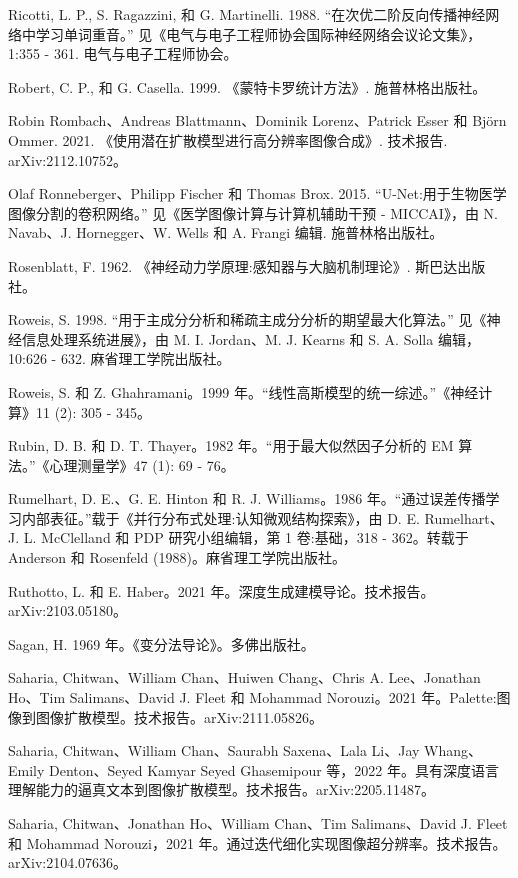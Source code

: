 \documentclass[10pt]{article}
\begin{document}
Ricotti, L. P., S. Ragazzini, 和 G. Martinelli. 1988. “在次优二阶反向传播神经网络中学习单词重音。” 见《电气与电子工程师协会国际神经网络会议论文集》，1:355 - 361. 电气与电子工程师协会。

Robert, C. P., 和 G. Casella. 1999. 《蒙特卡罗统计方法》. 施普林格出版社。

Robin Rombach、Andreas Blattmann、Dominik Lorenz、Patrick Esser 和 Björn Ommer. 2021. 《使用潜在扩散模型进行高分辨率图像合成》. 技术报告. arXiv:2112.10752。

Olaf Ronneberger、Philipp Fischer 和 Thomas Brox. 2015. “U-Net:用于生物医学图像分割的卷积网络。” 见《医学图像计算与计算机辅助干预 - MICCAI》，由 N. Navab、J. Hornegger、W. Wells 和 A. Frangi 编辑. 施普林格出版社。

Rosenblatt, F. 1962. 《神经动力学原理:感知器与大脑机制理论》. 斯巴达出版社。

Roweis, S. 1998. “用于主成分分析和稀疏主成分分析的期望最大化算法。” 见《神经信息处理系统进展》，由 M. I. Jordan、M. J. Kearns 和 S. A. Solla 编辑，10:626 - 632. 麻省理工学院出版社。

Roweis, S. 和 Z. Ghahramani。1999 年。“线性高斯模型的统一综述。”《神经计算》11 (2): 305 - 345。

Rubin, D. B. 和 D. T. Thayer。1982 年。“用于最大似然因子分析的 EM 算法。”《心理测量学》47 (1): 69 - 76。

Rumelhart, D. E.、G. E. Hinton 和 R. J. Williams。1986 年。“通过误差传播学习内部表征。”载于《并行分布式处理:认知微观结构探索》，由 D. E. Rumelhart、J. L. McClelland 和 PDP 研究小组编辑，第 1 卷:基础，318 - 362。转载于 Anderson 和 Rosenfeld (1988)。麻省理工学院出版社。

Ruthotto, L. 和 E. Haber。2021 年。深度生成建模导论。技术报告。arXiv:2103.05180。

Sagan, H. 1969 年。《变分法导论》。多佛出版社。

Saharia, Chitwan、William Chan、Huiwen Chang、Chris A. Lee、Jonathan Ho、Tim Salimans、David J. Fleet 和 Mohammad Norouzi。2021 年。Palette:图像到图像扩散模型。技术报告。arXiv:2111.05826。

Saharia, Chitwan、William Chan、Saurabh Saxena、Lala Li、Jay Whang、Emily Denton、Seyed Kamyar Seyed Ghasemipour 等，2022 年。具有深度语言理解能力的逼真文本到图像扩散模型。技术报告。arXiv:2205.11487。

Saharia, Chitwan、Jonathan Ho、William Chan、Tim Salimans、David J. Fleet 和 Mohammad Norouzi，2021 年。通过迭代细化实现图像超分辨率。技术报告。arXiv:2104.07636。
\end{document}
